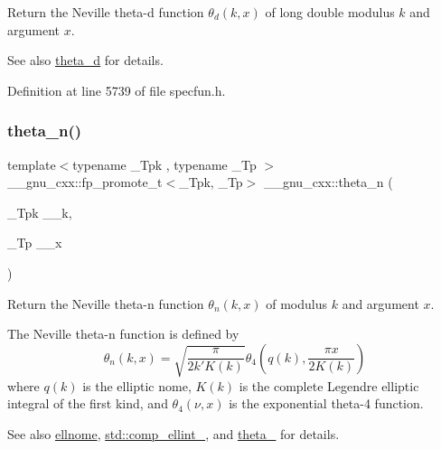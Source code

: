 Return the Neville theta-\/d function $ \theta_d(k,x) $ of {\ttfamily long double} modulus $ k $ and argument $ x $.

\begin{DoxySeeAlso}{See also}
\hyperlink{group__gnu__math__spec__func_ga258edb995137d9e6344b3cd750266d74}{theta\+\_\+d} for details. 
\end{DoxySeeAlso}


Definition at line 5739 of file specfun.\+h.

\mbox{\label{group__gnu__math__spec__func_ga202778bd650e04e9f3729bfca35c32e2}} 
\subsubsection{\texorpdfstring{theta\+\_\+n()}{theta\_n()}}
{\footnotesize\ttfamily template$<$typename \+\_\+\+Tpk , typename \+\_\+\+Tp $>$ \\
\+\_\+\+\_\+gnu\+\_\+cxx\+::fp\+\_\+promote\+\_\+t$<$\+\_\+\+Tpk, \+\_\+\+Tp$>$ \+\_\+\+\_\+gnu\+\_\+cxx\+::theta\+\_\+n (\begin{DoxyParamCaption}\item[{\+\_\+\+Tpk}]{\+\_\+\+\_\+k,  }\item[{\+\_\+\+Tp}]{\+\_\+\+\_\+x }\end{DoxyParamCaption})\hspace{0.3cm}{\ttfamily [inline]}}

Return the Neville theta-\/n function $ \theta_n(k,x) $ of modulus $ k $ and argument $ x $.

The Neville theta-\/n function is defined by \[ \theta_n(k,x) = \sqrt{\frac{\pi}{2k'K(k)}} \theta_4\left(q(k),\frac{\pi x}{2K(k)}\right) \] where $ q(k) $ is the elliptic nome, $ K(k) $ is the complete Legendre elliptic integral of the first kind, and $ \theta_4(\nu,x) $ is the exponential theta-\/4 function. \begin{DoxySeeAlso}{See also}
\hyperlink{group__gnu__math__spec__func_ga7bfb34f8b5c0ed7c72040f9cb7034bba}{ellnome}, \hyperlink{group__tr29124__math__spec__func_gad559217fb01e7a8b7a6e23eeedda64be}{std\+::comp\+\_\+ellint\+\_}, and \hyperlink{group__gnu__math__spec__func_ga8a6f8b69272a9f205a13e1745832ada3}{theta\+\_} for details.
\end{DoxySeeAlso}

